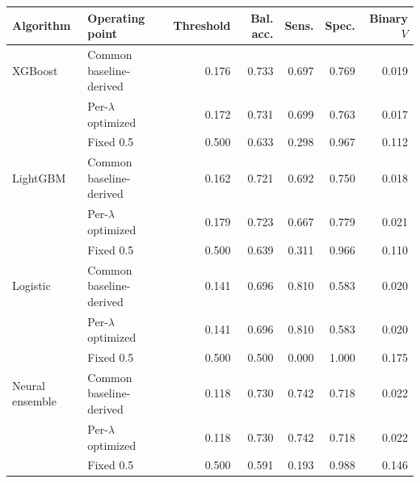 \begin{tabular}{llrrrrr}
\toprule
Algorithm & Operating point & Threshold & Bal. acc. & Sens. & Spec. & Binary $V$ \\
\midrule
XGBoost & Common baseline-derived & 0.176 & 0.733 & 0.697 & 0.769 & 0.019 \\
 & Per-$\lambda$ optimized & 0.172 & 0.731 & 0.699 & 0.763 & 0.017 \\
 & Fixed 0.5 & 0.500 & 0.633 & 0.298 & 0.967 & 0.112 \\
\addlinespace
LightGBM & Common baseline-derived & 0.162 & 0.721 & 0.692 & 0.750 & 0.018 \\
 & Per-$\lambda$ optimized & 0.179 & 0.723 & 0.667 & 0.779 & 0.021 \\
 & Fixed 0.5 & 0.500 & 0.639 & 0.311 & 0.966 & 0.110 \\
\addlinespace
Logistic & Common baseline-derived & 0.141 & 0.696 & 0.810 & 0.583 & 0.020 \\
 & Per-$\lambda$ optimized & 0.141 & 0.696 & 0.810 & 0.583 & 0.020 \\
 & Fixed 0.5 & 0.500 & 0.500 & 0.000 & 1.000 & 0.175 \\
\addlinespace
Neural ensemble & Common baseline-derived & 0.118 & 0.730 & 0.742 & 0.718 & 0.022 \\
 & Per-$\lambda$ optimized & 0.118 & 0.730 & 0.742 & 0.718 & 0.022 \\
 & Fixed 0.5 & 0.500 & 0.591 & 0.193 & 0.988 & 0.146 \\
\bottomrule
\end{tabular}

